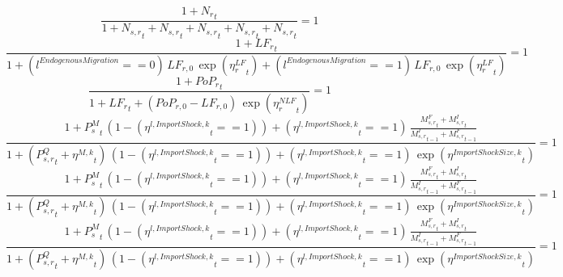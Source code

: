 \noindent[name= `regional total employment 1']
\begin{dmath}
\frac{1+{{N_r}}_{t}}{1+{{N_{s,r}}}_{t}+{{N_{s,r}}}_{t}+{{N_{s,r}}}_{t}+{{N_{s,r}}}_{t}+{{N_{s,r}}}_{t}}=1
\end{dmath}
\noindent[name= `regional labour force 1']
\begin{dmath}
\frac{1+{{LF_r}}_{t}}{1+\left({{l^{Endogenous Migration}}}==0\right)\, {{LF_{r,0}}}\, \exp\left({{\eta^{LF}_{r}}}_{t}\right)+\left({{l^{Endogenous Migration}}}==1\right)\, {{LF_{r,0}}}\, \exp\left({{\eta^{LF}_{r}}}_{t}\right)}=1
\end{dmath}
\noindent[name= `regional population 1']
\begin{dmath}
\frac{1+{{PoP_r}}_{t}}{1+{{LF_r}}_{t}+\left({{PoP_{r,0}}}-{{LF_{r,0}}}\right)\, \exp\left({{\eta^{NLF}_{r}}}_{t}\right)}=1
\end{dmath}
\noindent[name= `import price 1']
\begin{dmath}
\frac{1+{{P^{M}_s}}_{t}\, \left(1-\left({{\eta^{l,Import Shock,k}}}_{t}==1\right)\right)+\left({{\eta^{l,Import Shock,k}}}_{t}==1\right)\, \frac{{{M^F_{s,r}}}_{t}+{{M^I_{s,r}}}_{t}}{{{M^I_{s,r}}}_{t-1}+{{M^F_{s,r}}}_{t-1}}}{1+\left({{P^Q_{s,r}}}_{t}+{{\eta^{M,k}}}_{t}\right)\, \left(1-\left({{\eta^{l,Import Shock,k}}}_{t}==1\right)\right)+\left({{\eta^{l,Import Shock,k}}}_{t}==1\right)\, \exp\left({{\eta^{Import Shock Size,k}}}_{t}\right)}=1
\end{dmath}
\noindent[name= `import price 2']
\begin{dmath}
\frac{1+{{P^{M}_s}}_{t}\, \left(1-\left({{\eta^{l,Import Shock,k}}}_{t}==1\right)\right)+\left({{\eta^{l,Import Shock,k}}}_{t}==1\right)\, \frac{{{M^F_{s,r}}}_{t}+{{M^I_{s,r}}}_{t}}{{{M^I_{s,r}}}_{t-1}+{{M^F_{s,r}}}_{t-1}}}{1+\left({{P^Q_{s,r}}}_{t}+{{\eta^{M,k}}}_{t}\right)\, \left(1-\left({{\eta^{l,Import Shock,k}}}_{t}==1\right)\right)+\left({{\eta^{l,Import Shock,k}}}_{t}==1\right)\, \exp\left({{\eta^{Import Shock Size,k}}}_{t}\right)}=1
\end{dmath}
\noindent[name= `import price 3']
\begin{dmath}
\frac{1+{{P^{M}_s}}_{t}\, \left(1-\left({{\eta^{l,Import Shock,k}}}_{t}==1\right)\right)+\left({{\eta^{l,Import Shock,k}}}_{t}==1\right)\, \frac{{{M^F_{s,r}}}_{t}+{{M^I_{s,r}}}_{t}}{{{M^I_{s,r}}}_{t-1}+{{M^F_{s,r}}}_{t-1}}}{1+\left({{P^Q_{s,r}}}_{t}+{{\eta^{M,k}}}_{t}\right)\, \left(1-\left({{\eta^{l,Import Shock,k}}}_{t}==1\right)\right)+\left({{\eta^{l,Import Shock,k}}}_{t}==1\right)\, \exp\left({{\eta^{Import Shock Size,k}}}_{t}\right)}=1
\end{dmath}
